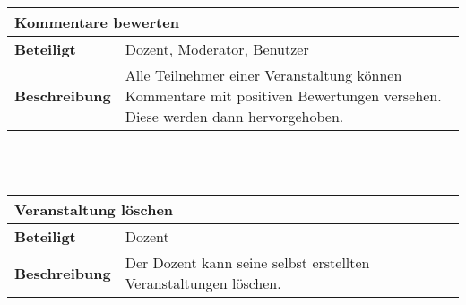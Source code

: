 \documentclass[12pt,a4paper]{article}
\begin{document}
\begin{tabular}{l p{10cm}}
\multicolumn{2}{l}{\textbf{Kommentare bewerten}} \\ \hline
\textbf{Beteiligt} & Dozent, Moderator, Benutzer \\ \hline 
\textbf{Beschreibung} & Alle Teilnehmer einer Veranstaltung können Kommentare mit positiven Bewertungen versehen. Diese werden dann hervorgehoben.\\ 
\hline 
\end{tabular}\\\\

\begin{tabular}{l p{10cm}}
\multicolumn{2}{l}{\textbf{Veranstaltung löschen}} \\ \hline
\textbf{Beteiligt} & Dozent \\ \hline 
\textbf{Beschreibung} & Der Dozent kann seine selbst erstellten Veranstaltungen löschen.\\ 
\hline 
\end{tabular}\\\\
\end{document}
